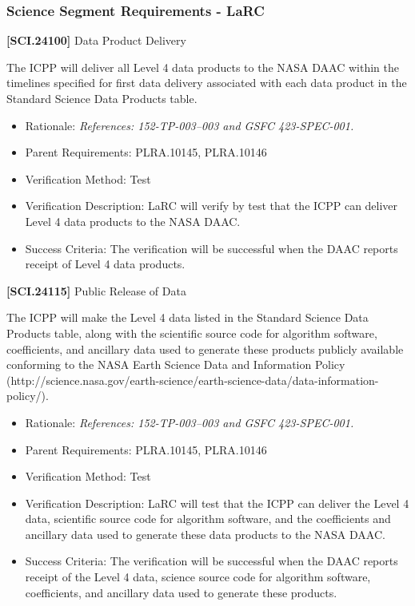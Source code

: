 \subsubsection{Science Segment Requirements - LaRC}
\label{sciencesegmentrequirements-larc}

\textbf{[SCI.24100]} Data Product Delivery

The \gls{ICPP} will deliver all Level 4 data products to the NASA \gls{DAAC} within the timelines specified for first data delivery associated with each data product in the Standard Science Data Products table.

\begin{itemize}
\item{} Rationale: \emph{References: 152-TP-003--003 and GSFC 423-SPEC-001.}

\item{} Parent Requirements: PLRA.10145, PLRA.10146

\item{} Verification Method: Test

\item{} Verification Description: \gls{LaRC} will verify by \gls{test} that the \gls{ICPP} can deliver Level 4 data products to the NASA \gls{DAAC}.

\item{} Success Criteria: The verification will be successful when the \gls{DAAC} reports receipt of Level 4 data products.

\end{itemize}

\textbf{[SCI.24115]} Public Release of Data

The \gls{ICPP} will make the Level 4 data listed in the Standard Science Data Products table, along with the scientific source code for algorithm software, coefficients, and ancillary data used to generate these products publicly available conforming to the NASA Earth Science Data and Information Policy (http:\slash \slash science.nasa.gov\slash earth-science\slash earth-science-data\slash data-information-policy\slash ).

\begin{itemize}
\item{} Rationale: \emph{References: 152-TP-003--003 and GSFC 423-SPEC-001.}

\item{} Parent Requirements: PLRA.10145, PLRA.10146

\item{} Verification Method: Test

\item{} Verification Description: \gls{LaRC} will \gls{test} that the \gls{ICPP} can deliver the Level 4 data, scientific source code for algorithm software, and the coefficients and ancillary data used to generate these data products to the NASA \gls{DAAC}.

\item{} Success Criteria: The verification will be successful when the \gls{DAAC} reports receipt of the Level 4 data, science source code for algorithm software, coefficients, and ancillary data used to generate these products.

\end{itemize}

